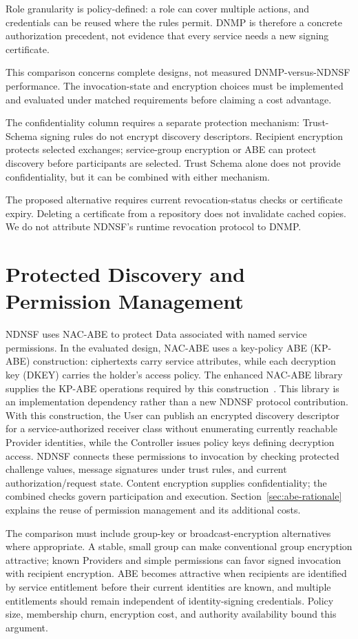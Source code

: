 Role granularity is policy-defined: a role can cover multiple actions, and credentials can be reused where the rules permit. DNMP is therefore a concrete authorization precedent, not evidence that every service needs a new signing certificate.

This comparison concerns complete designs, not measured DNMP-versus-NDNSF performance. The invocation-state and encryption choices must be implemented and evaluated under matched requirements before claiming a cost advantage.

The confidentiality column requires a separate protection mechanism: Trust-Schema signing rules do not encrypt discovery descriptors.
Recipient encryption protects selected exchanges; service-group encryption or ABE can protect discovery before participants are selected. Trust Schema alone does not provide confidentiality, but it can be combined with either mechanism.

The proposed alternative requires current revocation-status checks or certificate expiry. Deleting a certificate from a repository does not invalidate cached copies. We do not attribute NDNSF's runtime revocation protocol to DNMP.

\section{Protected Discovery and Permission Management}
NDNSF uses NAC-ABE to protect Data associated with named service permissions. In the evaluated design, NAC-ABE uses a key-policy ABE (KP-ABE) construction: ciphertexts carry service attributes, while each decryption key (DKEY) carries the holder's access policy. The enhanced NAC-ABE library supplies the KP-ABE operations required by this construction~\cite{dulal2023nacabe}. This library is an implementation dependency rather than a new NDNSF protocol contribution. With this construction, the User can publish an encrypted discovery descriptor for a service-authorized receiver class without enumerating currently reachable Provider identities, while the Controller issues policy keys defining decryption access. NDNSF connects these permissions to invocation by checking protected challenge values, message signatures under trust rules, and current authorization/request state. Content encryption supplies confidentiality; the combined checks govern participation and execution. Section~\ref{sec:abe-rationale} explains the reuse of permission management and its additional costs.

The comparison must include group-key or broadcast-encryption alternatives where appropriate. A stable, small group can make conventional group encryption attractive; known Providers and simple permissions can favor signed invocation with recipient encryption. ABE becomes attractive when recipients are identified by service entitlement before their current identities are known, and multiple entitlements should remain independent of identity-signing credentials. Policy size, membership churn, encryption cost, and authority availability bound this argument.

